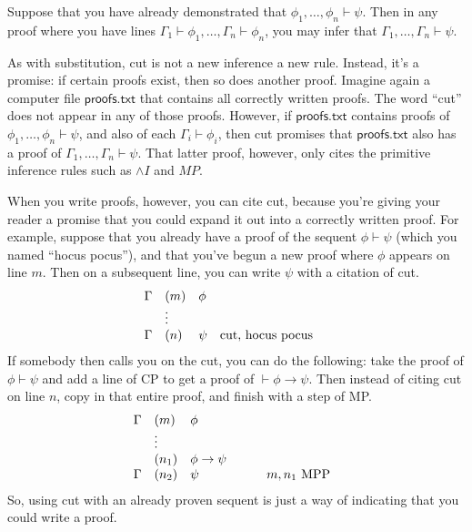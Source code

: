\bigskip \begin{tcolorbox}[enhanced,width=10cm,title=cut,attach boxed
  title to top left={yshift=-2mm,xshift=4mm},boxed title style={sharp
    corners}]
  Suppose that you have already demonstrated that \newline
  $\phi _1,\dots ,\phi _n\vdash\psi$.  Then in any proof where you
  have lines $\Gamma _1\vdash\phi _1,\dots ,\Gamma _n\vdash\phi _n$,
  you may infer that $\Gamma _1,\dots ,\Gamma _n\vdash \psi$.
\end{tcolorbox}
\bigskip As with substitution, cut is not a new inference a new rule.
Instead, it's a promise: if certain proofs exist, then so does another
proof.  Imagine again a computer file $\mathsf{proofs.txt}$ that
contains all correctly written proofs.  The word ``cut'' does not
appear in any of those proofs.  However, if $\mathsf{proofs.txt}$
contains proofs of $\phi _1,\dots ,\phi _n\vdash\psi$, and also of
each $\Gamma _i\vdash\phi _i$, then cut promises that
$\mathsf{proofs.txt}$ also has a proof of
$\Gamma _1,\dots ,\Gamma _n\vdash\psi$.  That latter proof, however,
only cites the primitive inference rules such as $\wedge I$ and $MP$.

When you write proofs, however, you can cite cut, because you're
giving your reader a promise that you could expand it out into a
correctly written proof.  For example, suppose that you already have a
proof of the sequent $\phi\vdash\psi$ (which you named ``hocus
pocus''), and that you've begun a new proof where $\phi$ appears on
line $m$.  Then on a subsequent line, you can write $\psi$ with a
citation of cut.
\[ \begin{array}{l l l p{3cm}}
     \Gamma & (m) & \phi & \\
            & \vdots \\
     \Gamma & (n) & \psi & cut, hocus pocus \end{array} \] If somebody
 then calls you on the cut, you can do the following: take the proof of $\phi\vdash\psi$ and add a line of CP to get a proof of $\vdash\phi\to\psi$.  Then instead of citing cut on line $n$, copy in that entire proof, and finish with a step of MP.
\[ \begin{array}{l l >{$}p{1.75cm}<{$} p{2cm}}
     \Gamma & (m) & \phi & \\
            & \vdots \\
            & (n_1) & \phi\to\psi  & \\
     \Gamma & (n_2) & \psi         & $m,n_1$ MPP \end{array} \]
So, using cut with an already proven sequent is just a way of
indicating that you could write a proof.  

